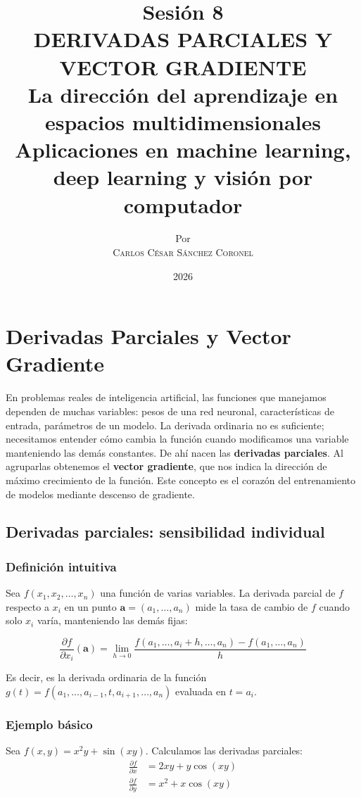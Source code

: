 \documentclass[12pt,a4paper,openany,oneside]{book}
\title{
    \textbf{Sesión 8} \\ 
    \Huge \textbf{DERIVADAS PARCIALES Y VECTOR GRADIENTE} \\
    \large La dirección del aprendizaje en espacios multidimensionales \\
    \normalsize Aplicaciones en machine learning, deep learning y visión por computador
}
\author{
    \small Por \\ \vspace{0.2cm}
    \Large \textsc{Carlos César Sánchez Coronel}
}
\date{2026}
\begin{document}
\maketitle
\tableofcontents
{}

\chapter{Derivadas Parciales y Vector Gradiente}

En problemas reales de inteligencia artificial, las funciones que manejamos dependen de muchas variables: pesos de una red neuronal, características de entrada, parámetros de un modelo. La derivada ordinaria no es suficiente; necesitamos entender cómo cambia la función cuando modificamos una variable manteniendo las demás constantes. De ahí nacen las \textbf{derivadas parciales}. Al agruparlas obtenemos el \textbf{vector gradiente}, que nos indica la dirección de máximo crecimiento de la función. Este concepto es el corazón del entrenamiento de modelos mediante descenso de gradiente.

\section{Derivadas parciales: sensibilidad individual}

\subsection{Definición intuitiva}
Sea $f(x_1, x_2, \dots, x_n)$ una función de varias variables. La derivada parcial de $f$ respecto a $x_i$ en un punto $\mathbf{a} = (a_1, \dots, a_n)$ mide la tasa de cambio de $f$ cuando solo $x_i$ varía, manteniendo las demás fijas:

\[
\frac{\partial f}{\partial x_i}(\mathbf{a}) = \lim_{h \to 0} \frac{f(a_1, \dots, a_i + h, \dots, a_n) - f(a_1, \dots, a_n)}{h}
\]

Es decir, es la derivada ordinaria de la función $g(t) = f(a_1, \dots, a_{i-1}, t, a_{i+1}, \dots, a_n)$ evaluada en $t = a_i$.

\subsection{Ejemplo básico}
Sea $f(x, y) = x^2 y + \sin(xy)$. Calculamos las derivadas parciales:
\begin{align*}
\frac{\partial f}{\partial x} &= 2xy + y \cos(xy) \\
\frac{\partial f}{\partial y} &= x^2 + x \cos(xy)
\end{align*}
\end{document}
